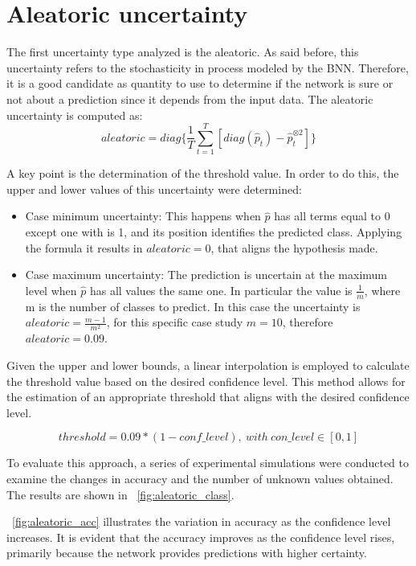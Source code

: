 \section{Aleatoric uncertainty}

The first uncertainty type analyzed is the aleatoric. As said before, this uncertainty refers to the stochasticity in process modeled by the BNN. Therefore, it is a good candidate as quantity to use to determine if the network is sure or not about a prediction since it depends from the input data. The aleatoric uncertainty is computed as:
\[
	aleatoric = diag\{\frac{1}{T} \sum_{t=1}^{T} [diag(\hat{p}_t) - \hat{p}_t^{\otimes 2}]\}
\]

A key point is the determination of the threshold value. In order to do this, the upper and lower values of this uncertainty  were determined:

\begin{itemize}
	\item Case minimum uncertainty: This happens when $\hat{p}$ has all terms equal to 0 except one with is 1, and its position identifies the predicted class. Applying the formula it results in $aleatoric = 0$, that aligns the hypothesis made. 
	\item Case maximum uncertainty: The prediction is uncertain at the maximum level when $\hat{p}$ has all values the same one. In particular the value is $\frac{1}{m}$, where m is the number of classes to predict. In this case the uncertainty is $aleatoric = \frac{m-1}{m^2}$, for this specific case study $m = 10$, therefore $aleatoric = 0.09$.
\end{itemize}

Given the upper and lower bounds, a linear interpolation is employed to calculate the threshold value based on the desired confidence level. This method allows for the estimation of an appropriate threshold that aligns with the desired confidence level. 

\[
	threshold = 0.09 * (1 - conf \_ level), \ with \ con \_ level \in [0,1]
\]


To evaluate this approach, a series of experimental simulations were conducted to examine the changes in accuracy and the number of unknown values obtained. The results are shown in \Fig~\ref{fig:aleatoric_class}.

\Fig~\ref{fig:aleatoric_acc} illustrates the variation in accuracy as the confidence level increases. It is evident that the accuracy improves as the confidence level rises, primarily because the network provides predictions with higher certainty.

